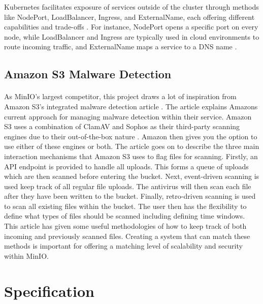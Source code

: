 \documentclass[12pt, conference, final, a4paper, onecolumn, compsoc]{IEEEtran}
\begin{document}
Kubernetes facilitates exposure of services outside of the cluster through
methods like NodePort, LoadBalancer, Ingress, and ExternalName, each offering
different capabilities and trade-offs \citep{k8s-struct}. For instance,
NodePort opens a specific port on every node, while LoadBalancer and Ingress are
typically used in cloud environments to route incoming traffic, and ExternalName
maps a service to a DNS name \citep{k8s-struct}.

\subsection{Amazon S3 Malware Detection} %
\paragraph{}

As MinIO's largest competitor, this project draws a lot of inspiration from
Amazon S3's integrated malware detection article \citep{amazon-md}. The article
explains Amazons current approach for managing malware detection within their
service. Amazon S3 uses a combination of ClamAV and Sophos as their third-party
scanning engines due to their out-of-the-box nature \citep{amazon-md}. Amazon then gives you the
option to use either of these engines or both. The article goes on to describe the
three main interaction mechanisms that Amazon S3 uses to flag files for
scanning. Firstly, an API endpoint is provided to handle all uploads. This
forms a queue of uploads which are then scanned before entering the bucket.
Next, event-driven scanning is used keep track of all regular file uploads. The
antivirus will then scan each file after they have been written to the bucket.
Finally, retro-driven scanning is used to scan all existing files within the
bucket. The user then has the flexibility to define what types of files should
be scanned including defining time windows. This article has given some useful
methodologies of how to keep track of both incoming and previously scanned
files. Creating a system that can match these methods is important for offering
a matching level of scalability and security within MinIO.



\section{Specification}
\end{document}
